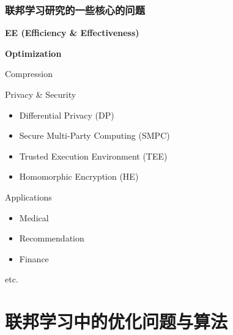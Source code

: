 
\begin{frame}
\frametitle{联邦学习研究的一些核心的问题}

\begin{itemize}
    \item {\Large\bfseries EE (Efficiency \& Effectiveness)}
    \begin{itemize}
        \item[$\bullet$] {\large\bfseries Optimization}
        \vspace{0.5em}
        \pause
        { \footnotesize
        \item[$\bullet$] Compression
        }
    \end{itemize}
    \vspace{1em}
    { \footnotesize
    \item Privacy \& Security
    \begin{itemize}
        \item[$\bullet$] Differential Privacy (DP)
        \item[$\bullet$] Secure Multi-Party Computing (SMPC)
        \item[$\bullet$] Trusted Execution Environment (TEE)
        \item[$\bullet$] Homomorphic Encryption (HE)
    \end{itemize}
    \item Applications
    \begin{itemize}
        \item[$\bullet$] Medical
        \item[$\bullet$] Recommendation
        \item[$\bullet$] Finance
    \end{itemize}
    \item etc.
    }
\end{itemize}

\end{frame}


\section[联邦学习中的优化]{联邦学习中的优化问题与算法}


